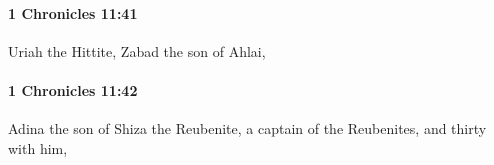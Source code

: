		\paragraph{1 Chronicles 11:41} %
			\label{1CHRONICLES-11-41}

			Uriah the Hittite, Zabad the son of Ahlai,


		\paragraph{1 Chronicles 11:42} %
			\label{1CHRONICLES-11-42}

			Adina the son of Shiza the Reubenite, a captain of the Reubenites, and thirty with him,


